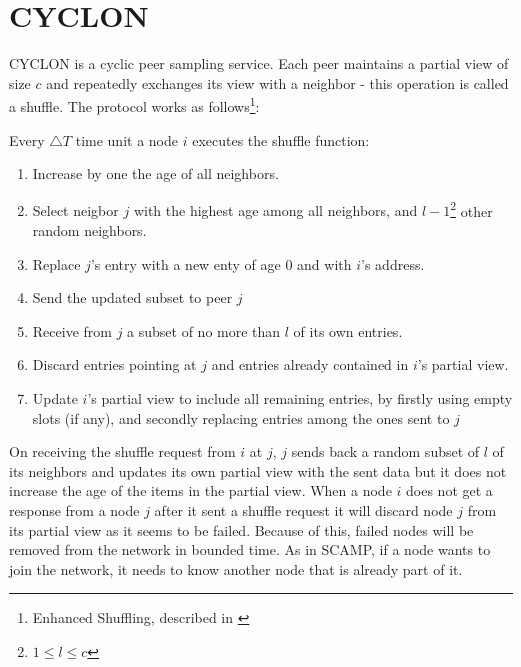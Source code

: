 \documentclass[11pt, english, screen]{report-rd-info}
\begin{document}
\section{CYCLON}

CYCLON \cite{Voulgaris05cyclon:inexpensive} is a cyclic peer sampling service.
Each peer maintains a partial view of size $c$ and repeatedly exchanges its view with a neighbor - this operation is called a shuffle.
The protocol works as follows\footnote{Enhanced Shuffling, described in \cite{Voulgaris05cyclon:inexpensive}}:

Every $\bigtriangleup T$ time unit a node $i$ executes the shuffle function:

\begin{enumerate}
    \item{Increase by one the age of all neighbors.}
    \item{Select neigbor $j$ with the highest age among all neighbors, and $l-1$\footnote{$1 \le l \le c$}} other random neighbors.
    \item{Replace $j$'s entry with a new enty of age 0 and with $i$'s address.}
    \item{Send the updated subset to peer $j$}
    \item{Receive from $j$ a subset of no more than $l$ of its own entries.}
    \item{Discard entries pointing at $j$ and entries already contained in $i$'s partial view.}
    \item{Update $i$'s partial view to include all remaining entries, by firstly using empty slots (if any), and secondly replacing entries among the ones sent to $j$}
\end{enumerate}

On receiving the shuffle request from $i$ at $j$, $j$ sends back a random subset of $l$ of its neighbors and updates its own partial view with the sent data but it does not increase the age of the items in the partial view.
When a node $i$ does not get a response from a node $j$ after it sent a shuffle request it will discard node $j$ from its partial view as it seems to be failed. 
Because of this, failed nodes will be removed from the network in bounded time.
As in SCAMP, if a node wants to join the network, it needs to know another node that is already part of it.
\end{document}
